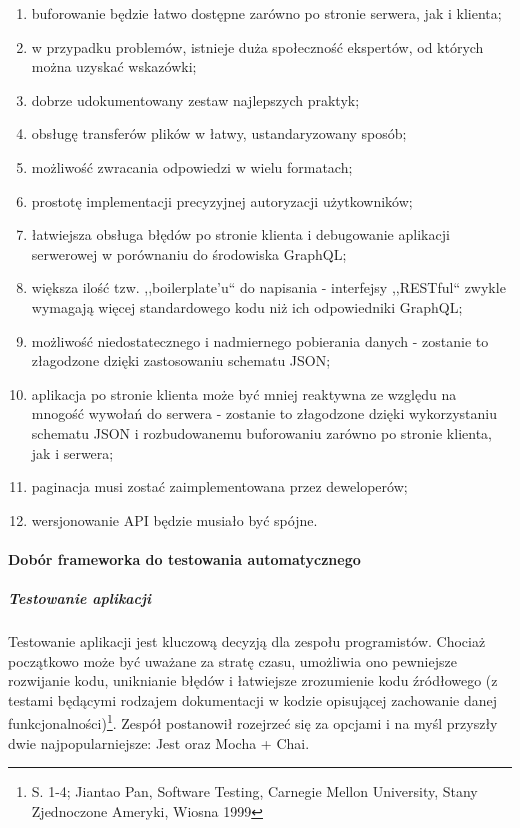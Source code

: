 \documentclass[12pt, a4paper, twoside, openany]{book}
\begin{document}
\begin{enumerate}[label=--]
    \item buforowanie będzie łatwo dostępne zarówno po stronie serwera, jak i klienta;
    \item w przypadku problemów, istnieje duża społeczność ekspertów, od których można uzyskać wskazówki;
    \item dobrze udokumentowany zestaw najlepszych praktyk;
    \item obsługę transferów plików w łatwy, ustandaryzowany sposób;
    \item możliwość zwracania odpowiedzi w wielu formatach;
    \item prostotę implementacji precyzyjnej autoryzacji użytkowników;
    \item łatwiejsza obsługa błędów po stronie klienta i debugowanie aplikacji serwerowej w porównaniu do środowiska GraphQL;
    \item większa ilość tzw. ,,boilerplate'u`` do napisania - interfejsy ,,RESTful`` zwykle wymagają więcej standardowego kodu niż ich odpowiedniki GraphQL;
    \item możliwość niedostatecznego i nadmiernego pobierania danych - zostanie to złagodzone dzięki zastosowaniu schematu JSON;
    \item aplikacja po stronie klienta może być mniej reaktywna ze względu na mnogość wywołań do serwera - zostanie to złagodzone dzięki wykorzystaniu schematu JSON i rozbudowanemu buforowaniu zarówno po stronie klienta, jak i serwera;
    \item paginacja musi zostać zaimplementowana przez deweloperów;
    \item wersjonowanie API będzie musiało być spójne.
\end{enumerate}

\paragraph{Dobór frameworka do testowania automatycznego}
\subparagraph{Testowanie aplikacji\\}

Testowanie aplikacji jest kluczową decyzją dla zespołu programistów.
Chociaż początkowo może być uważane za stratę czasu, umożliwia ono pewniejsze rozwijanie kodu, uniknianie błędów i łatwiejsze zrozumienie kodu źródłowego (z testami będącymi rodzajem dokumentacji w kodzie opisującej zachowanie danej funkcjonalności)\footnote{S. 1-4; Jiantao Pan, Software Testing, Carnegie Mellon University, Stany Zjednoczone Ameryki, Wiosna 1999}.
Zespół postanowił rozejrzeć się za opcjami i na myśl przyszły dwie najpopularniejsze: Jest oraz Mocha + Chai.
\end{document}
